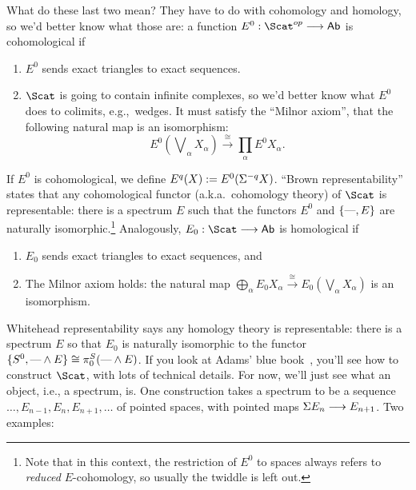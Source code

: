 What do these last two mean?  They have to do with cohomology and homology, so we'd better know what those are: a function $E^0: \Scat^{op} \to \Ab$ is cohomological if
\begin{enumerate}
\item $E^0$ sends exact triangles to exact sequences.
\item $\Scat$ is going to contain infinite complexes, so we'd better know what $E^0$ does to colimits, e.g.,\ wedges. It must satisfy the ``Milnor axiom'', that the following natural map is an isomorphism:
\[
E^0({\textstyle{\!\bigvee}_\alpha X_\alpha}) \stackrel{\cong}{\to} \prod_\alpha E^0 X_\alpha
.\]
\end{enumerate}
If $E^0$ is cohomological, we define $E^q (X) := E^0 (\Sigma^{-q} X)$. ``Brown representability'' states that any cohomological functor (a.k.a.\ cohomology theory) of $\Scat$ is representable: there is a spectrum $E$ such that the functors $E^0$ and $\{\textup{---}, E\}$ are naturally isomorphic.\footnote{Note that in this context, the restriction of $E^0$ to spaces always refers to \emph{reduced} $E$-cohomology, so usually the twiddle is left out.}  Analogously, $E_0: \Scat \to \Ab$ is homological if
\begin{enumerate}
\item $E_0$ sends exact triangles to exact sequences, and
\item The Milnor axiom holds: the natural map $\bigoplus_\alpha E_0 X_\alpha \stackrel{\cong}{\to} E_0(\bigvee_\alpha X_\alpha)$ is an isomorphism.
\end{enumerate}
Whitehead representability says any homology theory is representable: there is a spectrum $E$ so that $E_0$ is naturally isomorphic to the functor $\{S^0, \text{---} \wedge E\} \cong \pi^S_0(\text{---} \wedge E)$.  If you look at Adams' blue book~\cite{Adams}, you'll see how to construct $\Scat$, with lots of technical details.  For now, we'll just see what an object, i.e., a spectrum, is.  One construction takes a spectrum to be a sequence $\ldots, E_{n-1}, E_n, E_{n+1}, \ldots$ of pointed spaces, with pointed maps $\Sigma E_n \longrightarrow E_{n+1}$.  Two examples:
